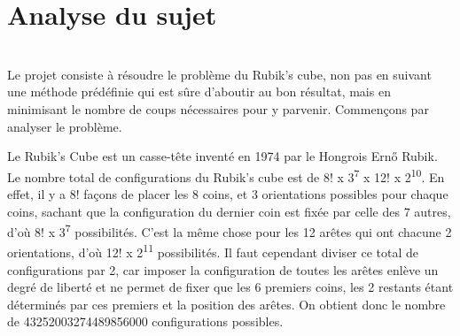 \documentclass[fleqn,10pt,french]{SelfArx} %
\affiliation{*\textbf{Code source}: https://github.com/lyx-x/Rubik}
\begin{document}
\flushbottom %

\maketitle %

\renewcommand{\contentsname}{Table des matières}
\tableofcontents %

\thispagestyle{empty} %


\section{Analyse du sujet} %

~\\\indent
Le projet consiste à résoudre le problème du Rubik's cube, non pas en suivant une méthode prédéfinie qui est sûre d'aboutir au bon résultat, mais en minimisant le nombre de coups nécessaires pour y parvenir. Commençons par analyser le problème.

Le Rubik’s Cube est un casse-tête inventé en 1974 par le Hongrois Ernő Rubik. Le nombre total de configurations du Rubik's cube est de 8! x 3\textsuperscript{7} x 12! x 2\textsuperscript{10}. En effet, il y a 8! façons de placer les 8 coins, et 3 orientations possibles pour chaque coins, sachant que la configuration du dernier coin est fixée par celle des 7 autres, d'où 8! x 3\textsuperscript{7} possibilités. C'est la même chose pour les 12 arêtes qui ont chacune 2 orientations, d'où 12! x 2\textsuperscript{11} possibilités. Il faut cependant diviser ce total de configurations par 2, car imposer la configuration de toutes les arêtes enlève un degré de liberté et ne permet de fixer que les 6 premiers coins, les 2 restants étant déterminés par ces premiers et la position des arêtes. On obtient donc le nombre de 43252003274489856000 configurations possibles.
\end{document}
